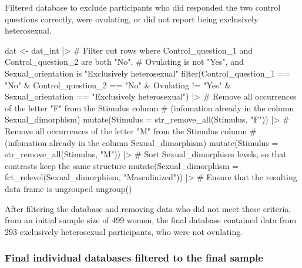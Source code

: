 \documentclass[
  bookmarksnumbered]{article}
\newenvironment{Shaded}{\begin{snugshade}}{\end{snugshade}}
\newcommand{\AttributeTok}[1]{\textcolor[rgb]{0.80,0.80,0.80}{#1}}
\newcommand{\CommentTok}[1]{\textcolor[rgb]{0.50,0.62,0.50}{#1}}
\newcommand{\FunctionTok}[1]{\textcolor[rgb]{0.94,0.94,0.56}{#1}}
\newcommand{\NormalTok}[1]{\textcolor[rgb]{0.80,0.80,0.80}{#1}}
\newcommand{\OtherTok}[1]{\textcolor[rgb]{0.94,0.94,0.56}{#1}}
\newcommand{\SpecialCharTok}[1]{\textcolor[rgb]{0.86,0.64,0.64}{#1}}
\newcommand{\StringTok}[1]{\textcolor[rgb]{0.80,0.58,0.58}{#1}}
\begin{document}
Filtered database to exclude participants who did responded the two control questions correctly, were ovulating, or did not report being exclusively heterosexual.

\begin{Shaded}
\begin{Highlighting}[]
\NormalTok{dat }\OtherTok{\textless{}{-}}\NormalTok{ dat\_int }\SpecialCharTok{|\textgreater{}}
  \CommentTok{\# Filter out rows where Control\_question\_1 and Control\_question\_2 are both "No",}
  \CommentTok{\# Ovulating is not "Yes", and Sexual\_orientation is "Exclusively heterosexual"}
  \FunctionTok{filter}\NormalTok{(Control\_question\_1 }\SpecialCharTok{==} \StringTok{"No"} \SpecialCharTok{\&}
\NormalTok{    Control\_question\_2 }\SpecialCharTok{==} \StringTok{"No"} \SpecialCharTok{\&}
\NormalTok{    Ovulating }\SpecialCharTok{!=} \StringTok{"Yes"} \SpecialCharTok{\&}
\NormalTok{    Sexual\_orientation }\SpecialCharTok{==} \StringTok{"Exclusively heterosexual"}\NormalTok{) }\SpecialCharTok{|\textgreater{}}
  \CommentTok{\# Remove all occurrences of the letter "F" from the Stimulus column}
  \CommentTok{\# (infomation already in the column Sexual\_dimorphism)}
  \FunctionTok{mutate}\NormalTok{(}\AttributeTok{Stimulus =} \FunctionTok{str\_remove\_all}\NormalTok{(Stimulus, }\StringTok{"F"}\NormalTok{)) }\SpecialCharTok{|\textgreater{}}
  \CommentTok{\# Remove all occurrences of the letter "M" from the Stimulus column}
  \CommentTok{\# (infomation already in the column Sexual\_dimorphism)}
  \FunctionTok{mutate}\NormalTok{(}\AttributeTok{Stimulus =} \FunctionTok{str\_remove\_all}\NormalTok{(Stimulus, }\StringTok{"M"}\NormalTok{)) }\SpecialCharTok{|\textgreater{}}
  \CommentTok{\# Sort Sexual\_dimorphism levels, so that contrasts keep the same structure}
  \FunctionTok{mutate}\NormalTok{(}\AttributeTok{Sexual\_dimorphism =} \FunctionTok{fct\_relevel}\NormalTok{(Sexual\_dimorphism, }\StringTok{"Masculinized"}\NormalTok{)) }\SpecialCharTok{|\textgreater{}} 
  \CommentTok{\# Ensure that the resulting data frame is ungrouped}
  \FunctionTok{ungroup}\NormalTok{()}
\end{Highlighting}
\end{Shaded}

After filtering the database and removing data who did not meet these criteria, from an initial sample size of 499 women, the final database contained data from 293 exclusively heterosexual participants, who were not ovulating.

\subsubsection{Final individual databases filtered to the final sample}\label{final-individual-databases-filtered-to-the-final-sample}
\end{document}
